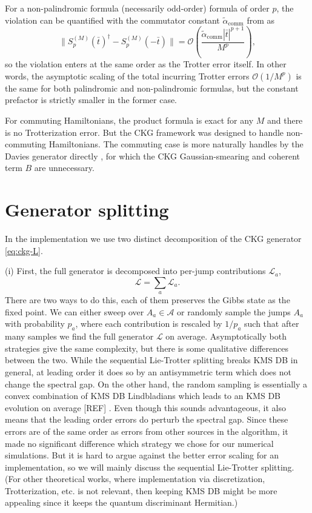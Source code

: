For a non-palindromic formula (necessarily odd-order) formula of order $p$, the violation can be quantified with the commutator constant $\tilde{\alpha}_\text{comm}$ from \cite{childs2021theory} as 
$$
\|S_p^{(M)}(\bar{t})^\dagger - S_p^{(M)}(-\bar{t})\| = \mathcal{O}\left(\frac{\tilde{\alpha}_\text{comm} |\bar{t}|^{p + 1}}{M^p}\right), 
$$
so the violation enters at the same order as the Trotter error itself. In other words, the asymptotic scaling of the total incurring Trotter errors $\mathcal{O}(1 / M^p)$ is the same for both palindromic and non-palindromic formulas, but the constant prefactor is strictly smaller in the former case.

For commuting Hamiltonians, the product formula is exact for any $M$ and there is no Trotterization error. But the CKG framework was designed to handle non-commuting Hamiltonians. The commuting case is more naturally handles by the Davies generator directly \cite[text]{kastoryano2016quantum,bardet2023rapid}, for which the CKG Gaussian-smearing and coherent term $B$ are unnecessary.

\smallskip
\label{sec:ckg-gensplit}
\section{Generator splitting}
In the implementation we use two distinct decomposition of the CKG generator \eqref{eq:ckg-L}. 

(i) First, the full generator is decomposed into per-jump contributions $\mathcal{L}_a$,
$$
\mathcal{L} = \sum_a \mathcal{L}_a.
$$
There are two ways to do this, each of them preserves the Gibbs state as the fixed point. We can either sweep over $A_a \in \mathcal{A}$ or randomly sample the jumps $A_a$ with probability $p_a$, where each contribution is rescaled by $1 / p_a$ such that after many samples we find the full generator $\mathcal{L}$ on average. Asymptotically both strategies give the same complexity, but there is some qualitative differences between the two. While the sequential Lie-Trotter splitting breaks KMS DB in general, at leading order it does so by an antisymmetric term which does not change the spectral gap. On the other hand, the random sampling is essentially a convex combination of KMS DB Lindbladians which leads to an KMS DB evolution on average [REF] . Even though this sounds advantageous, it also means that the leading order errors do perturb the spectral gap. Since these errors are of the same order as errors from other sources in the algorithm, it made no significant difference which strategy we chose for our numerical simulations. But it is hard to argue against the better error scaling for an implementation, so we will mainly discuss the sequential Lie-Trotter splitting. (For other theoretical works, where implementation via discretization, Trotterization, etc. is not relevant, then keeping KMS DB might be more appealing since it keeps the quantum discriminant Hermitian.)

